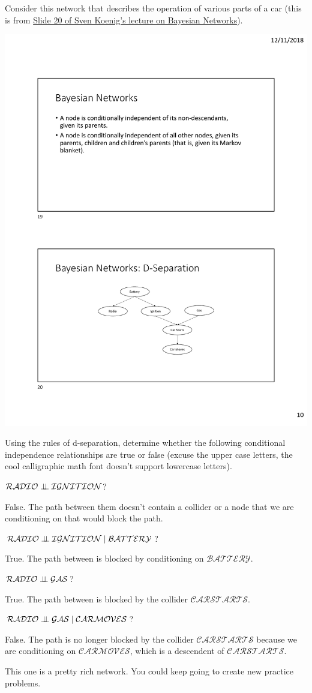 \documentclass[review_Solutions]{subfiles}
\begin{document}
\begin{exercise}
Consider this network that describes the operation of various parts of a car (this is from \href{http://idm-lab.org/intro-to-ai/slides/Bayesian\_Networks.pdf}{Slide 20 of Sven Koenig's lecture on Bayesian Networks}).

\begin{center}
\includegraphics[width=0.6\linewidth]{figures/carnetwork}
\end{center}

Using the rules of d-separation, determine whether the following conditional independence relationships are true or false (excuse the upper case letters, the cool calligraphic math font doesn't support lowercase letters).
\bi
\item $\mathcal{RADIO} \perp\!\!\!\perp \mathcal{IGNITION}$?
\begin{boxedsolution}
False.  The path between them doesn't contain a collider or a node that we are conditioning on that would block the path. 
\end{boxedsolution}
\item $\mathcal{RADIO} \perp\!\!\!\perp \mathcal{IGNITION}\mid\mathcal{BATTERY}$?
\begin{boxedsolution}
True.  The path between is blocked by conditioning on $\mathcal{BATTERY}$.
\end{boxedsolution}
\item $\mathcal{RADIO} \perp\!\!\!\perp \mathcal{GAS}$?
\begin{boxedsolution}
True.  The path between is blocked by the collider $\mathcal{CAR STARTS}$.
\end{boxedsolution}
\item $\mathcal{RADIO} \perp\!\!\!\perp \mathcal{GAS}\mid\mathcal{CAR MOVES}$?
\begin{boxedsolution}
False.  The path is no longer blocked by the collider $\mathcal{CAR STARTS}$ because we are conditioning on $\mathcal{CAR MOVES}$, which is a descendent of $\mathcal{CAR STARTS}$.
\end{boxedsolution}
\item This one is a pretty rich network.  You could keep going to create new practice problems.
\ei
\end{exercise}
\end{document}
